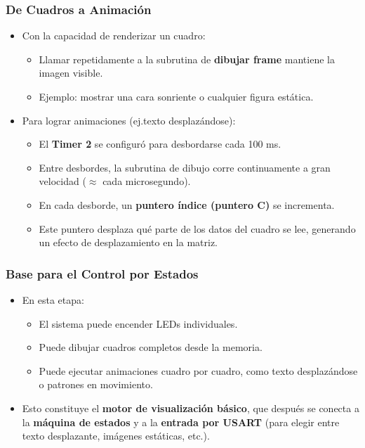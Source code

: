 \subsubsection{De Cuadros a Animación}
\begin{itemize}[leftmargin=2em]
    \item Con la capacidad de renderizar un cuadro:
    \begin{itemize}
        \item Llamar repetidamente a la subrutina de \textbf{dibujar frame} mantiene la imagen visible.
        \item Ejemplo: mostrar una cara sonriente o cualquier figura estática.
    \end{itemize}
    \item Para lograr animaciones (ej.\@ texto desplazándose):
    \begin{itemize}
        \item El \textbf{Timer 2} se configuró para desbordarse cada 100 ms.
        \item Entre desbordes, la subrutina de dibujo corre continuamente a gran velocidad ($\approx$ cada microsegundo).
        \item En cada desborde, un \textbf{puntero índice (puntero C)} se incrementa.
        \item Este puntero desplaza qué parte de los datos del cuadro se lee, generando un efecto de desplazamiento en la matriz.
    \end{itemize}
\end{itemize}

\subsubsection{Base para el Control por Estados}
\begin{itemize}[leftmargin=2em]
    \item En esta etapa:
    \begin{itemize}
        \item El sistema puede encender LEDs individuales.
        \item Puede dibujar cuadros completos desde la memoria.
        \item Puede ejecutar animaciones cuadro por cuadro, como texto desplazándose o patrones en movimiento.
    \end{itemize}
    \item Esto constituye el \textbf{motor de visualización básico}, que después se conecta a la \textbf{máquina de estados} y a la \textbf{entrada por USART} (para elegir entre texto desplazante, imágenes estáticas, etc.).
\end{itemize}

